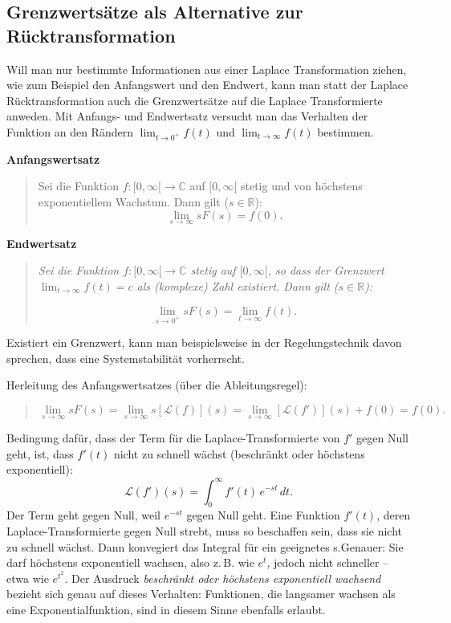 \addvspace{1cm}
\subsection{Grenzwertsätze als Alternative zur Rücktransformation}

Will man nur bestimmte Informationen aus einer Laplace Transformation ziehen, wie zum Beispiel den Anfangswert und den Endwert, kann man statt der Laplace Rücktransformation auch die Grenzwertsätze auf die Laplace Transformierte anweden. Mit Anfangs- und Endwertsatz versucht man das Verhalten der Funktion an den Rändern $\lim_{t \to 0^+} f(t)$ und $\lim_{t \to \infty} f(t)$
bestimmen.

\addvspace{1cm}
\textbf{Anfangswertsatz}
\begin{quote}
    Sei die Funktion \( f : [0,\infty[ \rightarrow \mathbb{C} \) auf \( [0,\infty[ \) stetig und von höchstens exponentiellem Wachstum. Dann gilt (\( s \in \mathbb{R} \)):
    \[
    \lim_{s \to \infty} sF(s) = f(0).
    \]
\end{quote}


\addvspace{1cm}
\textbf{Endwertsatz}
\begin{quote}
    \textit{Sei die Funktion \( f : [0,\infty[ \rightarrow \mathbb{C} \) stetig auf \( [0,\infty[ \), so dass der Grenzwert \( \lim_{t \to \infty} f(t) = c \) als (komplexe) Zahl existiert. Dann gilt (\( s \in \mathbb{R} \)):}
    
    \[
    \lim_{s \to 0^+} sF(s) = \lim_{t \to \infty} f(t).
    \]
\end{quote}


Existiert ein Grenzwert, kann man beispielsweise in der Regelungstechnik davon sprechen, dass eine Systemstabilität vorherrscht.

Herleitung des Anfangswertsatzes (über die Ableitungsregel):
\begin{quote}
    \[
    \lim_{s \to \infty} sF(s) = \lim_{s \to \infty} s[\mathcal{L}(f)](s) = \lim_{s \to \infty} [\mathcal{L}(f')](s) + f(0) = f(0).
    \]
\end{quote}

Bedingung dafür, dass der Term für die Laplace-Transformierte von \( f' \) gegen Null geht, ist, dass \( f'(t) \) nicht zu schnell wächst (beschränkt oder höchstens exponentiell): 
\[
\mathcal{L}(f')(s) = \int_0^{\infty} f'(t)\, e^{-st} \, dt.
\]
Der Term geht gegen Null, weil \( e^{-st} \) gegen Null geht. Eine Funktion \( f'(t) \), deren Laplace-Transformierte gegen Null strebt, muss so beschaffen sein, dass sie nicht zu schnell wächst. Dann konvegiert das Integral für ein geeignetes s.Genauer: Sie darf höchstens exponentiell wachsen, also z.\,B. wie \( e^{t} \), jedoch nicht schneller – etwa wie \( e^{t^2} \). Der Ausdruck \textit{beschränkt oder höchstens exponentiell wachsend} bezieht sich genau auf dieses Verhalten: Funktionen, die langsamer wachsen als eine Exponentialfunktion, sind in diesem Sinne ebenfalls erlaubt.

